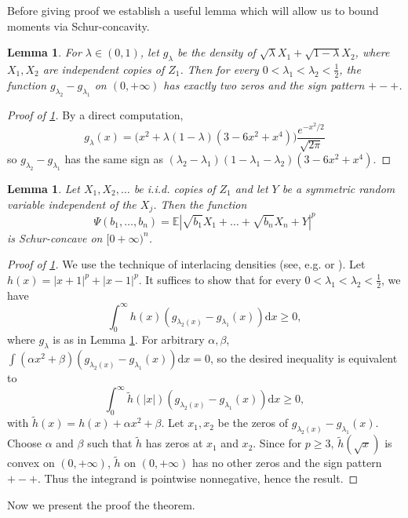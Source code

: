 \documentclass[10pt]{article}
\newcommand{\dd}{\mathrm{d}}
\newcommand{\E}{\mathbb{E}}
\newcommand{\1}{\textbf{1}}
\newtheorem{lemma}[theorem]{Lemma}
\theoremstyle{remark}
\theoremstyle{definition}
\begin{document}
Before giving proof we establish a useful lemma which will allow us to bound moments via Schur-concavity.

\begin{lemma}\label{lm:interlacing}
For $\lambda \in (0,1)$, let $g_\lambda$ be the density of $\sqrt{\lambda}X_1 + \sqrt{1-\lambda}X_2$, where $X_1, X_2$ are independent copies of $Z_1$. Then for every $0 < \lambda_1 < \lambda_2 < \frac{1}{2}$, the function $g_{\lambda_2} - g_{\lambda_1}$ on $(0,+\infty)$ has exactly two zeros and the sign pattern $+-+$.
\end{lemma}
\begin{proof}[Proof of \ref{lm:interlacing}]
By a direct computation, 
\[g_\lambda(x) = \Big(x^2+\lambda(1-\lambda)(3-6x^2+x^4)\Big)\frac{e^{-x^2/2}}{\sqrt{2\pi}}
\]
so $g_{\lambda_2} - g_{\lambda_1}$ has the same sign as $(\lambda_2-\lambda_1)(1-\lambda_1-\lambda_2)(3-6x^2+x^4)$.
\end{proof}


\begin{lemma}\label{lm:schur}
Let $X_1, X_2, \dots$ be i.i.d. copies of $Z_1$ and let $Y$ be a symmetric random variable independent of the $X_j$. Then the function
\[
\Psi(b_1,\dots,b_n) = \E|\sqrt{b_1}X_1+\dots+\sqrt{b_n}X_n + Y|^p
\]
is Schur-concave on $[0+\infty)^n$.
\end{lemma}
\begin{proof}[Proof of \ref{lm:schur}]
We use the technique of interlacing densities (see, e.g. \cite{ENT2} or \cite{NZ}). Let $h(x) = |x+1|^p+|x-1|^p$. It suffices to show that for every $0 < \lambda_1 < \lambda_2 < \frac{1}{2}$, we have
\[
\int_0^\infty h(x)(g_{\lambda_2(x)} - g_{\lambda_1}(x)) \dd x \geq 0,
\]
where $g_\lambda$ is as in Lemma \ref{lm:interlacing}. For arbitrary $\alpha, \beta$, $\int (\alpha x^2+\beta)(g_{\lambda_2(x)} - g_{\lambda_1}(x)) \dd x = 0$, so the desired inequality is equivalent to 
\[
\int_0^\infty \tilde h(|x|)(g_{\lambda_2(x)} - g_{\lambda_1}(x)) \dd x \geq 0,
\]
with $\tilde h(x) = h(x) + \alpha x^2 + \beta$. Let $x_1, x_2$ be the zeros of $g_{\lambda_2(x)} - g_{\lambda_1}(x)$. Choose $\alpha$ and $\beta$ such that $\tilde h$ has zeros at $x_1$ and $x_2$. Since for $p \geq 3$, $\tilde h(\sqrt{x})$ is convex on $(0,+\infty)$, $\tilde h$ on $(0,+\infty)$ has no other zeros and the sign pattern $+-+$. Thus the integrand is pointwise nonnegative, hence the result.
\end{proof}

Now we present the proof the theorem.
\end{document}
